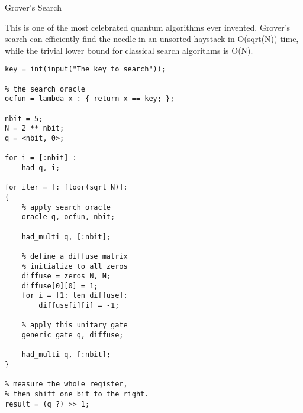 \documentclass[]{article}
\begin{document}
Grover's Search

This is one of the most celebrated quantum algorithms ever invented.
Grover's search can efficiently find the needle in an unsorted haystack
in O(sqrt(N)) time, while the trivial lower bound for classical search
algorithms is O(N).

\begin{verbatim}
key = int(input("The key to search"));

% the search oracle
ocfun = lambda x : { return x == key; };

nbit = 5;
N = 2 ** nbit;
q = <nbit, 0>;

for i = [:nbit] :
    had q, i;

for iter = [: floor(sqrt N)]:
{
    % apply search oracle
    oracle q, ocfun, nbit;

    had_multi q, [:nbit];

    % define a diffuse matrix
    % initialize to all zeros
    diffuse = zeros N, N;
    diffuse[0][0] = 1;
    for i = [1: len diffuse]:
        diffuse[i][i] = -1;

    % apply this unitary gate
    generic_gate q, diffuse;

    had_multi q, [:nbit];
}

% measure the whole register, 
% then shift one bit to the right.
result = (q ?) >> 1;
\end{verbatim}
\end{document}
